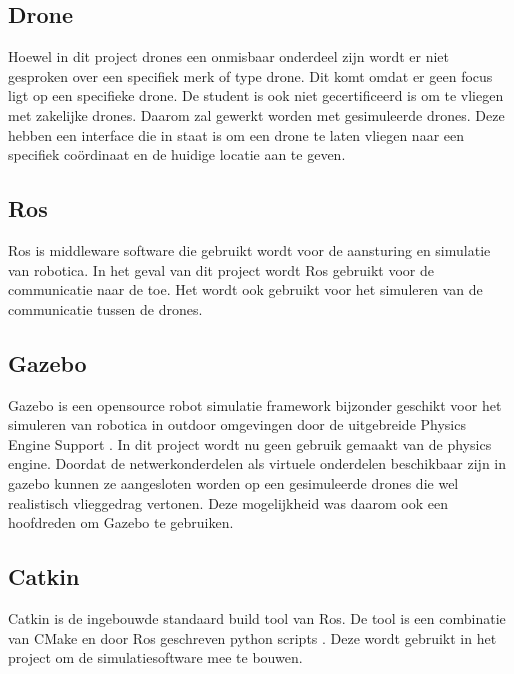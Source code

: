 \documentclass[a4paper, 11pt, oneside]{report}
\begin{document}
\subsection{Drone}
\label{inleiding:werkomgeving:drone}
Hoewel in dit project drones een onmisbaar onderdeel zijn wordt er niet gesproken over een specifiek merk of type drone.
Dit komt omdat er geen focus ligt op een specifieke drone.
De student is ook niet gecertificeerd is om te vliegen met zakelijke drones.
Daarom zal gewerkt worden met gesimuleerde drones. 
Deze hebben een interface die in staat is om een drone te laten vliegen naar een specifiek coördinaat en de huidige locatie aan te geven.

\subsection{Ros}
\label{inleiding:werkomgeving:ros}
Ros is middleware software die gebruikt wordt voor de aansturing en simulatie van robotica. 
In het geval van dit project wordt Ros gebruikt voor de communicatie naar de  toe.
Het wordt ook gebruikt voor het simuleren van de  communicatie tussen de drones. 

\subsection{Gazebo}
\label{inleiding:werkomgeving:gazebo}

Gazebo is een opensource robot simulatie framework bijzonder geschikt voor het simuleren van robotica in outdoor omgevingen door de uitgebreide Physics Engine Support \cite{gazebo}.
In dit project wordt nu geen gebruik gemaakt van de physics engine. Doordat de netwerkonderdelen als virtuele onderdelen beschikbaar zijn in gazebo kunnen ze aangesloten worden op een gesimuleerde drones die wel realistisch vlieggedrag vertonen.
Deze mogelijkheid was daarom ook een hoofdreden om Gazebo te gebruiken.

\subsection{Catkin}
\label{inleiding:werkomgeving:catkin}

Catkin is de ingebouwde standaard build tool van Ros. De tool is een combinatie van CMake en door Ros geschreven python scripts \cite{catkin}. Deze wordt gebruikt in het project om de simulatiesoftware mee te bouwen. 
\end{document}
